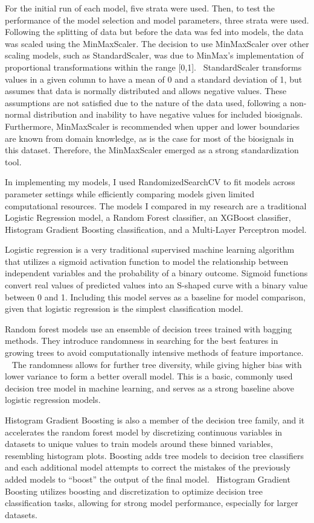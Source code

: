 \documentclass{article}
\begin{document}
For the initial run of each model, five strata were used. Then, to test the performance of the model selection and model parameters, three strata were used. Following the splitting of data but before the data was fed into models, the data was scaled using the MinMaxScaler. The decision to use MinMaxScaler over other scaling models, such as StandardScaler, was due to MinMax’s implementation of proportional transformations within the range [0,1].~\cite{scalercomparison} StandardScaler transforms values in a given column to have a mean of 0 and a standard deviation of 1, but assumes that data is normally distributed and allows negative values. These assumptions are not satisfied due to the nature of the data used, following a non-normal distribution and inability to have negative values for included biosignals. Furthermore, MinMaxScaler is recommended when upper and lower boundaries are known from domain knowledge, as is the case for most of the biosignals in this dataset. Therefore, the MinMaxScaler emerged as a strong standardization tool. 

In implementing my models, I used RandomizedSearchCV to fit models across parameter settings while efficiently comparing models given limited computational resources. The models I compared in my research are a traditional Logistic Regression model, a Random Forest classifier, an XGBoost classifier, Histogram Gradient Boosting classification, and a Multi-Layer Perceptron model. 

Logistic regression is a very traditional supervised machine learning algorithm that utilizes a sigmoid activation function to model the relationship between independent variables and the probability of a binary outcome. Sigmoid functions convert real values of predicted values into an S-shaped curve with a binary value between 0 and 1. Including this model serves as a baseline for model comparison, given that logistic regression is the simplest classification model. 

Random forest models use an ensemble of decision trees trained with bagging methods. They introduce randomness in searching for the best features in growing trees to avoid computationally intensive methods of feature importance. ~\cite{MachineLearningI} The randomness allows for further tree diversity, while giving higher bias with lower variance to form a better overall model. This is a basic, commonly used decision tree model in machine learning, and serves as a strong baseline above logistic regression models. 

Histogram Gradient Boosting is also a member of the decision tree family, and it accelerates the random forest model by discretizing continuous variables in datasets to unique values to train models around these binned variables, resembling histogram plots. Boosting adds tree models to decision tree classifiers and each additional model attempts to correct the mistakes of the previously added models to “boost” the output of the final model.~\cite{MachineLearningI} Histogram Gradient Boosting utilizes boosting and discretization to optimize decision tree classification tasks, allowing for strong model performance, especially for larger datasets. 
\end{document}
